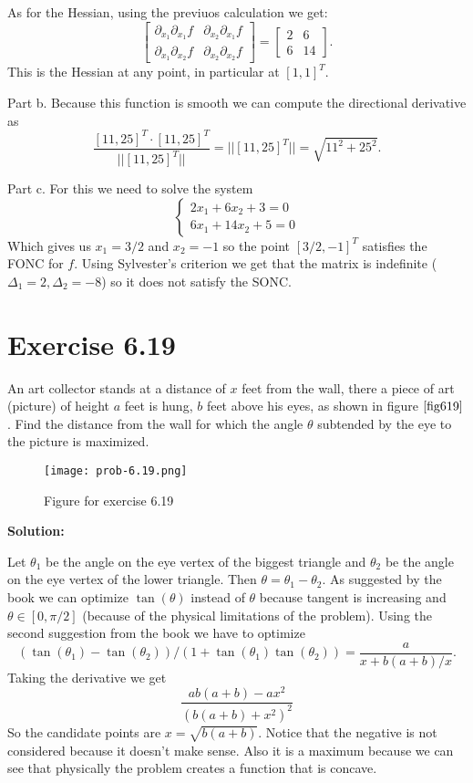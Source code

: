 \documentclass{article}
\begin{document}
As for the Hessian, using the previuos calculation we get:
\[
\begin{bmatrix}
\partial_{x_1}\partial_{x_1}f & \partial_{x_2}\partial_{x_1}f\\
\partial_{x_1}\partial_{x_2}f & \partial_{x_2}\partial_{x_2}f
\end{bmatrix}
=
\begin{bmatrix}
2 & 6\\
6 & 14
\end{bmatrix}.
\]
This is the Hessian at any point, in particular at $[1,1]^T$.

Part b. Because this function is smooth we can compute the directional
derivative as
\[
	\frac{[11,25]^T\cdot
	[11,25]^T}{||[11,25]^T||}=||[11,25]^T||=\sqrt{11^2+25^2}.
\]

Part c. For this we need to solve the system
\[
	\begin{cases}
	2x_1+6x_2+3=0\\
	6x_1+14x_2+5=0
	\end{cases}
\]
Which gives us $x_1=3/2$ and $x_2=-1$ so the point $[3/2,-1]^T$ satisfies the
FONC for $f$. Using Sylvester's criterion we get that the matrix is indefinite
($\Delta_1=2, \Delta_2=-8$)
so it does not satisfy the SONC.
\section*{Exercise 6.19}
An art collector stands at a distance of $x$ feet from the wall, there a piece
of art (picture) of height $a$ feet is hung, $b$ feet above his eyes, as shown
in figure $\ref{fig619}$. Find the distance from the wall for which the angle $\theta$
subtended by the eye to the picture is maximized.\\
\begin{figure}[ht]
	\center
	\caption{Figure for exercise 6.19}
	\texttt{[image: prob-6.19.png]}
	\label{fig619}
\end{figure}

\textbf{Solution:}

Let $\theta_1$ be the angle on the eye vertex of the biggest triangle and
$\theta_2$ be the angle on the eye vertex of the lower triangle. Then
$\theta=\theta_1 - \theta_2$. As suggested by the book we can optimize
$\tan(\theta)$ instead of $\theta$ because tangent is increasing and
$\theta\in[0,\pi/2]$ (because of the physical limitations of the problem).
Using the second suggestion from the book we have to optimize
\[
	(\tan(\theta_1) - \tan(\theta_2))/(1+\tan(\theta_1)\tan(\theta_2))=\frac{a}{x+b(a+b)/x}.
\]
Taking the derivative we get
\[
\frac{ab(a+b)-ax^2}{(b(a+b)+x^2)^2}
\]
So the candidate points are $x=\sqrt{b(a+b)}$. Notice that the negative is not
considered because it doesn't make sense. Also it is a maximum because we can
see that physically the problem creates a function that is concave.
\end{document}

